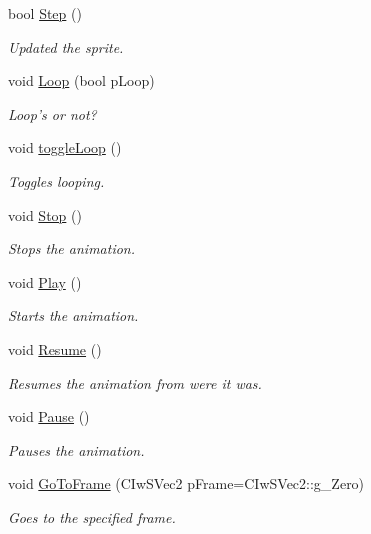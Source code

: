 \begin{DoxyCompactItemize}
bool \hyperlink{class_c_ty_sprite_ac32af738070627e8df2f0de208dbab6a}{Step} ()
\begin{DoxyCompactList}\small\item\em Updated the sprite. \end{DoxyCompactList}\item 
void \hyperlink{class_c_ty_sprite_ad57edffe6f3e932b24d48457facd73a0}{Loop} (bool pLoop)
\begin{DoxyCompactList}\small\item\em Loop's or not? \end{DoxyCompactList}\item 
void \hyperlink{class_c_ty_sprite_aec150e6cab1c604745b33425034e9333}{toggleLoop} ()
\begin{DoxyCompactList}\small\item\em Toggles looping. \end{DoxyCompactList}\item 
void \hyperlink{class_c_ty_sprite_aa4f43fb5f8b112598af616e9675f5936}{Stop} ()
\begin{DoxyCompactList}\small\item\em Stops the animation. \end{DoxyCompactList}\item 
void \hyperlink{class_c_ty_sprite_a9fc014571f6e81ccbfbd7d9d6c30aa24}{Play} ()
\begin{DoxyCompactList}\small\item\em Starts the animation. \end{DoxyCompactList}\item 
void \hyperlink{class_c_ty_sprite_a16e171457c700e7a3f6080759f5be354}{Resume} ()
\begin{DoxyCompactList}\small\item\em Resumes the animation from were it was. \end{DoxyCompactList}\item 
void \hyperlink{class_c_ty_sprite_a387bd6b832dfff1a75ab6c6b04e5a5e1}{Pause} ()
\begin{DoxyCompactList}\small\item\em Pauses the animation. \end{DoxyCompactList}\item 
void \hyperlink{class_c_ty_sprite_a627f6a648a2061d43608a84f423c805f}{GoToFrame} (CIwSVec2 pFrame=CIwSVec2::g\_\-Zero)
\begin{DoxyCompactList}\small\item\em Goes to the specified frame. \end{DoxyCompactList}\item 

\end{DoxyCompactItemize}
